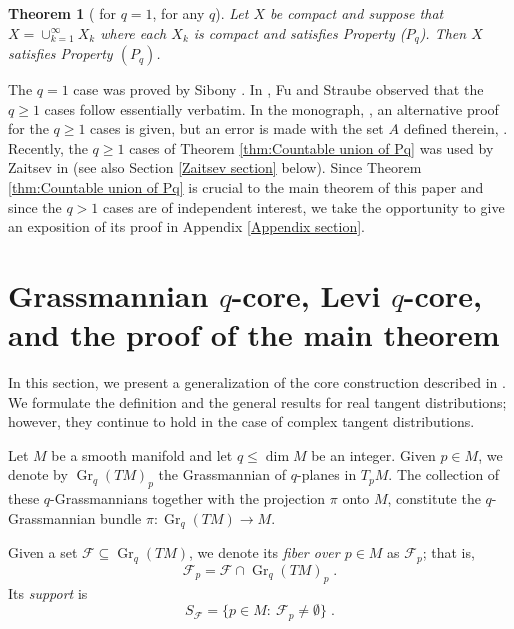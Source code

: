\documentclass[12pt]{amsart}
\newtheorem{theorem}{Theorem}[section]
\numberwithin{equation}{section}
{\theoremstyle{definition}
\newtheorem{remark}[theorem]{Remark}
}
\DeclareMathOperator{\Grass}{Gr}
\newcommand{\Gr}{\Grass}
\begin{document}
\begin{theorem}[ for $q=1$,  for any $q$]\label{countable union theorem}\label{thm:Countable union of Pq} Let $X$ be compact and suppose that $X = \cup_{k=1}^{\infty} X_k$ where each $X_k$ is compact and satisfies Property ($P_q$).  Then $X$ satisfies Property $(P_q)$.
\end{theorem}

The $q = 1$ case was proved by Sibony \cite{Si87}.  In \cite{FuSt01}, Fu and Straube observed that the $q \geq 1$ cases follow essentially verbatim.  
In the monograph, \cite[Corollary 4.14]{St10}, an alternative proof for the $q \geq 1$ cases is given, but an error is made with the set $A$ defined therein, \cite{St25}.  Recently, the $q \geq 1$ cases of Theorem \ref{thm:Countable union of Pq} was used by Zaitsev in \cite[Proposition 1.17]{Za24} (see also Section \ref{Zaitsev section} below).
Since Theorem \ref{thm:Countable union of Pq} is crucial to the main theorem of this paper and since the $q > 1$ cases are of independent interest, we take the opportunity to give an exposition of its proof in Appendix \ref{Appendix section}.

\section{Grassmannian $q$-core, Levi $q$-core, and the proof of the main theorem}\label{q-core section}

In this section, we present a generalization of the core construction described in \cite[Section 2]{DaMo21}. We formulate the definition and the general results for real tangent distributions; however, they continue to hold in the case of complex tangent distributions.

\medskip

Let $M$ be a smooth manifold and let $q\leq \dim M$ be an integer. Given $p\in M$, we denote by $\Gr_q(TM)_p$ the Grassmannian of $q$-planes in $T_pM$.  The collection of these $q$-Grassmannians together with the projection $\pi$ onto $M$, constitute the $q$-Grassmannian bundle $\pi:\Gr_q(TM)\to M$.

\medskip

Given a set $\mathcal{F}\subseteq\Gr_q(TM)$, we denote its \emph{fiber over $p\in M$} as $\mathcal{F}_p$; that is,
$$\mathcal{F}_p=\mathcal{F}\cap \Gr_q(TM)_p\;.$$
Its \emph{support} is
$$S_{\mathcal{F}}=\{p\in M:\ \mathcal{F}_p\neq\emptyset\}\;.$$
\end{document}
